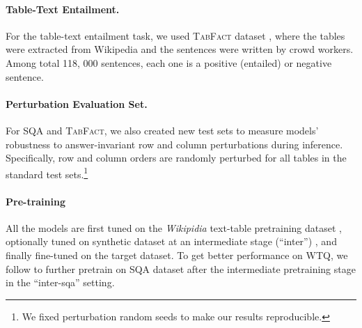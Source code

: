 \documentclass[11pt]{article}
\newcommand{\ag}[1]{{\color{blue} AG: #1}}
\newcommand{\jy}[1]{{\color{red} JY: #1}}
\begin{document}
\paragraph{Table-Text Entailment.} For the table-text entailment task, we used \textsc{TabFact} dataset \cite{chen2019tabfact}, where the tables were extracted from Wikipedia and the sentences were written by crowd workers.  Among total 118, 000 sentences, each one is a positive (entailed) or negative sentence.


\paragraph{Perturbation Evaluation Set.} For SQA and \textsc{TabFact}, we also created new test sets to measure models' robustness to answer-invariant row and column perturbations during inference. Specifically, row and column orders are randomly perturbed for all tables in the standard test sets.\footnote{We fixed perturbation random seeds to make our results reproducible.}

\paragraph{Pre-training} 
All the models are first tuned on the \emph{Wikipidia} text-table pretraining dataset \cite{herzig-etal-2020-tapas}, optionally tuned on synthetic dataset at an intermediate stage (``inter'') \cite{eisenschlos-etal-2020-understanding}, and finally fine-tuned on the target dataset.  To get better performance on \textsc{WTQ}, we follow \citet{herzig-etal-2020-tapas} to further pretrain on SQA dataset after the intermediate pretraining stage in the ``inter-sqa'' setting.

\end{document}
